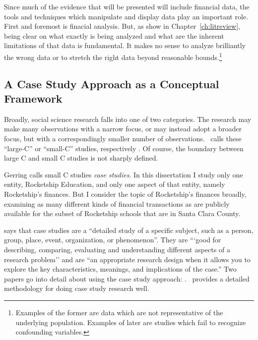 Since much of the evidence that will be presented will include financial data, the tools and techniques which manipulate and display data play an important role. First and foremost is finacial analysis. But, as \textcite{Epple.etal2016} show in Chapter~\ref{ch:litreview}, being clear on what exactly is being analyzed and what are the inherent limitations of that data is fundamental. It makes no sense to analyze brilliantly the wrong data or to stretch the right data beyond reasonable bounds.\footnote{Examples of the former are data which are not representative of the underlying population. Examples of later are studies which fail to recognize confounding variables.}

\subsection{A Case Study Approach as a Conceptual Framework}\indent
{}

Broadly, social science research falls into one of two categories. The research may make many observations with a narrow focus, or may instead adopt a broader focus, but with a correspondingly smaller number of observations.  \citeauthor{Gerring2017} calls these ``large-C'' or ``small-C'' studies, respectively \parencite[xvii]{Gerring2017}. Of course, the boundary between large C and small C studies is not sharply defined.

Gerring calls small C studies \textit{case studies}. In this dissertation I study only one entity, Rocketship Education, and only one aspect of that entity, namely Rocketship's finances. But I consider the topic of Rocketship's finances broadly, examining as many different kinds of financial transactions as are publicly available for the subset of Rocketship schools that are in Santa Clara County.

\textcite{McCombes2019} says that case studies are a ``detailed study of a specific subject, such as a person, group, place, event, organization, or phenomenon''. They are ```good for describing, comparing, evaluating and understanding different aspects of a research problem'' and are ``an appropriate research design when it allows you to explore the key characteristics, meanings, and implications of the case.'' Two papers go into detail about using the case study approach: \textcite{Crowe.etal2011,Rashid.etal2019}. \textcite{Yin2018} provides a detailed methodology for doing case study research well. %

